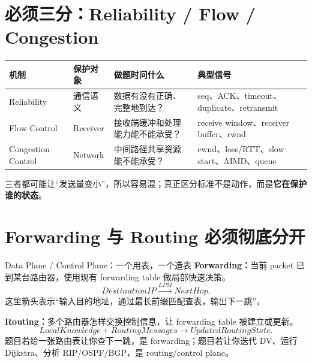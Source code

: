 \documentclass[11pt,a4paper,openany]{ctexbook}
\newcommand{\key}[1]{\textbf{\color{deep}#1}}
\begin{document}
\section{必须三分：Reliability / Flow / Congestion}
\begin{longtable}{L{2.8cm}L{2.7cm}L{3.6cm}L{\dimexpr\linewidth-10.37cm\relax}}
\toprule
\textbf{机制} & \textbf{保护对象} & \textbf{做题时问什么} & \textbf{典型信号}\\
\midrule
Reliability & 通信语义 & 数据有没有正确、完整地到达？ & seq、ACK、timeout、duplicate、retransmit \\
Flow Control & Receiver & 接收端缓冲和处理能力能不能承受？ & receive window、receiver buffer、rwnd \\
Congestion Control & Network & 中间路径共享资源能不能承受？ & cwnd、loss/RTT、slow start、AIMD、queue \\
\bottomrule
\end{longtable}
三者都可能让“发送量变小”，所以容易混；真正区分标准不是动作，而是\key{它在保护谁的状态}。

\section{Forwarding 与 Routing 必须彻底分开}
\begin{methodbox}{Data Plane / Control Plane：一个用表，一个造表}
\textbf{Forwarding：}当前 packet 已到某台路由器，使用现有 forwarding table 做局部快速决策。
\[
DestinationIP\xrightarrow{LPM}NextHop.
\]
这里箭头表示“输入目的地址，通过最长前缀匹配查表，输出下一跳”。

\textbf{Routing：}多个路由器怎样交换控制信息，让 forwarding table 被建立或更新。
\[
LocalKnowledge+RoutingMessages\rightarrow UpdatedRoutingState.
\]
题目若给一张路由表让你查下一跳，是 forwarding；题目若让你迭代 DV、运行 Dijkstra、分析 RIP/OSPF/BGP，是 routing/control plane。
\end{methodbox}
\end{document}

